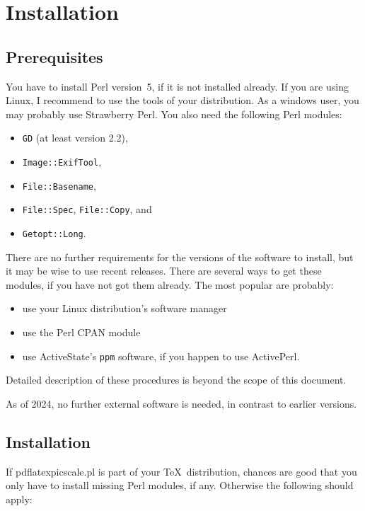 \documentclass[10pt,a4paper]{article}
\begin{document}
\section{Installation}

\subsection{Prerequisites}


You \label{section:requisites} have to install Perl version~5, if it is not
installed already. If you are using Linux, I recommend to use the tools of
your distribution. As a windows user, you may probably use Strawberry Perl.
You also need the following Perl modules:
\begin{itemize}
\item \texttt{GD} (at least version 2.2),
\item \texttt{Image::ExifTool}, 
\item \texttt{File::Basename}, 
\item \texttt{File::Spec},
\texttt{File::Copy}, and 
\item \texttt{Getopt::Long}. 
\end{itemize}

There are no further requirements for the versions of the software to install,
but it may be wise to use recent releases.
There are several ways to get these modules, if you have not got them
already. The most popular are probably:

\begin{itemize}
\item use your Linux distribution's software manager
\item use the Perl CPAN module
\item use ActiveState's \texttt{ppm} software, if you happen to use
  ActivePerl.
\end{itemize}

Detailed description of these procedures is beyond the scope of this
document.

As of 2024, no further external software is needed, in contrast to earlier
versions. 

\subsection{Installation}

If pdflatexpicscale.pl is part of your \TeX\ distribution,
chances are good that you only have to install missing Perl modules, if
any. Otherwise the following should apply:
\end{document}
